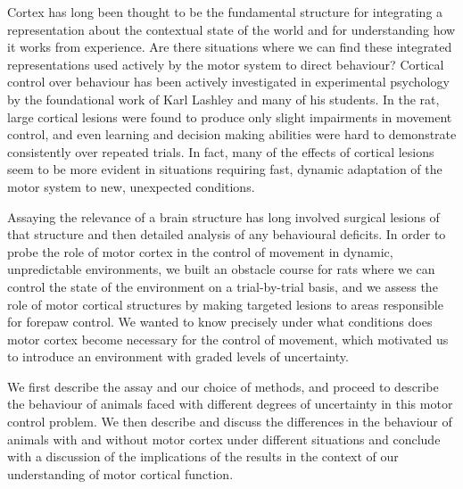 Cortex has long been thought to be the fundamental structure for integrating a representation about the contextual state of the world and for understanding how it works from experience. Are there situations where we can find these integrated representations used actively by the motor system to direct behaviour? Cortical control over behaviour has been actively investigated in experimental psychology by the foundational work of Karl Lashley and many of his students. In the rat, large cortical lesions were found to produce only slight impairments in movement control, and even learning and decision making abilities were hard to demonstrate consistently over repeated trials. In fact, many of the effects of cortical lesions seem to be more evident in situations requiring fast, dynamic adaptation of the motor system to new, unexpected conditions.

Assaying the relevance of a brain structure has long involved surgical lesions of that structure and then detailed analysis of any behavioural deficits. In order to probe the role of motor cortex in the control of movement in dynamic, unpredictable environments, we built an obstacle course for rats where we can control the state of the environment on a trial-by-trial basis, and we assess the role of motor cortical structures by making targeted lesions to areas responsible for forepaw control. We wanted to know precisely under what conditions does motor cortex become necessary for the control of movement, which motivated us to introduce an environment with graded levels of uncertainty.

We first describe the assay and our choice of methods, and proceed to describe the behaviour of animals faced with different degrees of uncertainty in this motor control problem. We then describe and discuss the differences in the behaviour of animals with and without motor cortex under different situations and conclude with a discussion of the implications of the results in the context of our understanding of motor cortical function.

